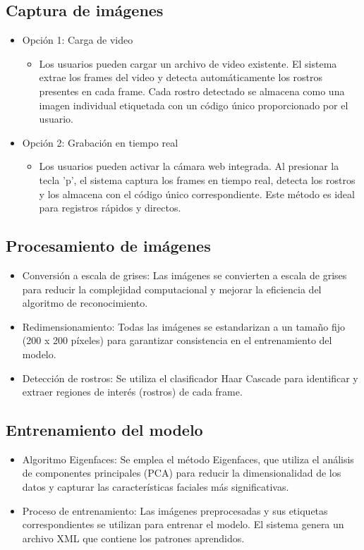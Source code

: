 \documentclass[12pt]{article}
\begin{document}
{\subsection{Captura de imágenes}
\begin{itemize}
	\item Opción 1: Carga de video
	\begin{itemize}
    	\item Los usuarios pueden cargar un archivo de video existente. El sistema extrae los frames del video y detecta automáticamente los rostros presentes en cada frame. Cada rostro detectado se almacena como una imagen individual etiquetada con un código único proporcionado por el usuario.
	\end{itemize}
	\item Opción 2: Grabación en tiempo real
	\begin{itemize}
    	\item Los usuarios pueden activar la cámara web integrada. Al presionar la tecla 'p', el sistema captura los frames en tiempo real, detecta los rostros y los almacena con el código único correspondiente. Este método es ideal para registros rápidos y directos.
	\end{itemize}
\end{itemize}

\subsection{Procesamiento de imágenes}
\begin{itemize}
	\item Conversión a escala de grises: Las imágenes se convierten a escala de grises para reducir la complejidad computacional y mejorar la eficiencia del algoritmo de reconocimiento.
	\item Redimensionamiento: Todas las imágenes se estandarizan a un tamaño fijo (200 x 200 píxeles) para garantizar consistencia en el entrenamiento del modelo.
	\item Detección de rostros: Se utiliza el clasificador Haar Cascade para identificar y extraer regiones de interés (rostros) de cada frame.
\end{itemize}

\subsection{Entrenamiento del modelo}
\begin{itemize}
	\item Algoritmo Eigenfaces: Se emplea el método Eigenfaces, que utiliza el análisis de componentes principales (PCA) para reducir la dimensionalidad de los datos y capturar las características faciales más significativas.
	\item Proceso de entrenamiento: Las imágenes preprocesadas y sus etiquetas correspondientes se utilizan para entrenar el modelo. El sistema genera un archivo XML que contiene los patrones aprendidos.


\end{itemize}}
\end{document}

